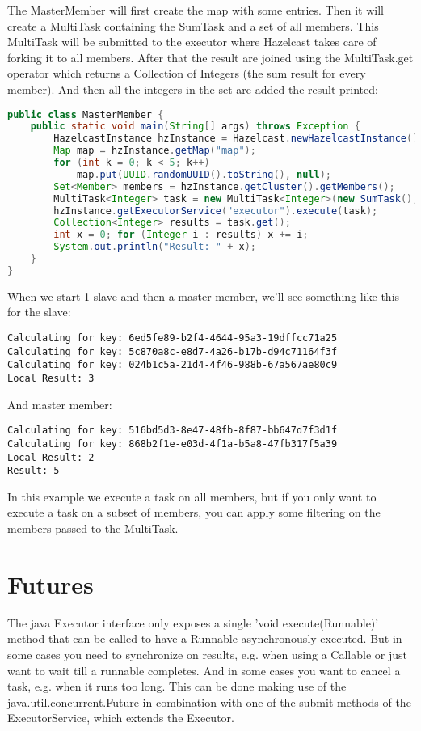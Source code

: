 The MasterMember will first create the map with some entries. Then it will create a MultiTask containing the SumTask and a set of all members. This MultiTask will be submitted to the executor where Hazelcast takes care of forking it to all members. After that the result are joined using the MultiTask.get operator which returns a Collection of Integers (the sum result for every member). And then all the integers in the set are added the result printed:
\begin{lstlisting}[language=java]
public class MasterMember {
    public static void main(String[] args) throws Exception {
        HazelcastInstance hzInstance = Hazelcast.newHazelcastInstance();
        Map map = hzInstance.getMap("map");
        for (int k = 0; k < 5; k++)
            map.put(UUID.randomUUID().toString(), null);
        Set<Member> members = hzInstance.getCluster().getMembers();
        MultiTask<Integer> task = new MultiTask<Integer>(new SumTask(), members);
        hzInstance.getExecutorService("executor").execute(task);
        Collection<Integer> results = task.get();
        int x = 0; for (Integer i : results) x += i;
        System.out.println("Result: " + x);
    }
}
\end{lstlisting}
When we start 1 slave and then a master member, we'll see something like this for the slave:
\begin{lstlisting}
Calculating for key: 6ed5fe89-b2f4-4644-95a3-19dffcc71a25
Calculating for key: 5c870a8c-e8d7-4a26-b17b-d94c71164f3f
Calculating for key: 024b1c5a-21d4-4f46-988b-67a567ae80c9
Local Result: 3
\end{lstlisting}
And master member:
\begin{lstlisting}
Calculating for key: 516bd5d3-8e47-48fb-8f87-bb647d7f3d1f
Calculating for key: 868b2f1e-e03d-4f1a-b5a8-47fb317f5a39
Local Result: 2
Result: 5
\end{lstlisting}
In this example we execute a task on all members, but if you only want to execute a task on a subset of members, you can apply some filtering on the members passed to the MultiTask.

\section{Futures}
The java Executor interface only exposes a single 'void execute(Runnable)' method that can be called to have a Runnable asynchronously executed. But in some cases you need to synchronize on results, e.g. when using a Callable or just want to wait till a runnable completes. And in some cases you want to cancel a task, e.g. when it runs too long. This can be done making use of the java.util.concurrent.Future in combination with one of the submit methods of the ExecutorService, which extends the Executor.

